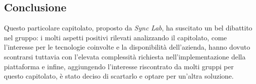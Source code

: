 \subsection{Conclusione}{
Questo particolare capitolato, proposto da \textit{Sync Lab}, ha suscitato un bel dibattito nel gruppo: i molti aspetti positivi rilevati analizzando il capitolato, come l'interesse per le tecnologie coinvolte e la disponibilità dell'azienda, hanno dovuto scontrarsi tuttavia con l'elevata complessità richiesta nell'implementazione della piattaforma e infine, aggiungendo l'interesse riscontrato da molti gruppi per questo capitolato, è stato deciso di scartarlo e optare per un'altra soluzione.
}

